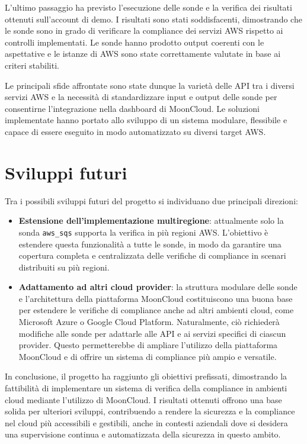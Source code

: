 L'ultimo passaggio ha previsto l'esecuzione delle sonde e la verifica dei risultati ottenuti sull'account di demo. I risultati sono stati soddisfacenti, dimostrando che le sonde sono in grado di verificare la compliance dei servizi AWS rispetto ai controlli implementati. Le sonde hanno prodotto output coerenti con le aspettative e le istanze di AWS sono state correttamente valutate in base ai criteri stabiliti.

Le principali sfide affrontate sono state dunque la varietà delle API tra i diversi servizi AWS e la necessità di standardizzare input e output delle sonde per consentirne l'integrazione nella dashboard di MoonCloud. Le soluzioni implementate hanno portato allo sviluppo di un sistema modulare, flessibile e capace di essere eseguito in modo automatizzato su diversi target AWS.

\section{Sviluppi futuri}
\label{sec:sviluppi_futuri}

Tra i possibili sviluppi futuri del progetto si individuano due principali direzioni:

\begin{itemize}
  \item \textbf{Estensione dell'implementazione multiregione}: attualmente solo la sonda \texttt{aws\_sqs} supporta la verifica in più regioni AWS. L'obiettivo è estendere questa funzionalità a tutte le sonde, in modo da garantire una copertura completa e centralizzata delle verifiche di compliance in scenari distribuiti su più regioni. 

  \item \textbf{Adattamento ad altri cloud provider}: la struttura modulare delle sonde e l'architettura della piattaforma MoonCloud costituiscono una buona base per estendere le verifiche di compliance anche ad altri ambienti cloud, come Microsoft Azure o Google Cloud Platform. Naturalmente, ciò richiederà modifiche alle sonde per adattarle alle API e ai servizi specifici di ciascun provider. Questo permetterebbe di ampliare l'utilizzo della piattaforma MoonCloud e di offrire un sistema di compliance più ampio e versatile.
\end{itemize}

In conclusione, il progetto ha raggiunto gli obiettivi prefissati, dimostrando la fattibilità di implementare un sistema di verifica della compliance in ambienti cloud mediante l'utilizzo di MoonCloud. I risultati ottenuti offrono una base solida per ulteriori sviluppi, contribuendo a rendere la sicurezza e la compliance nel cloud più accessibili e gestibili, anche in contesti aziendali dove si desidera una supervisione continua e automatizzata della sicurezza in questo ambito.
